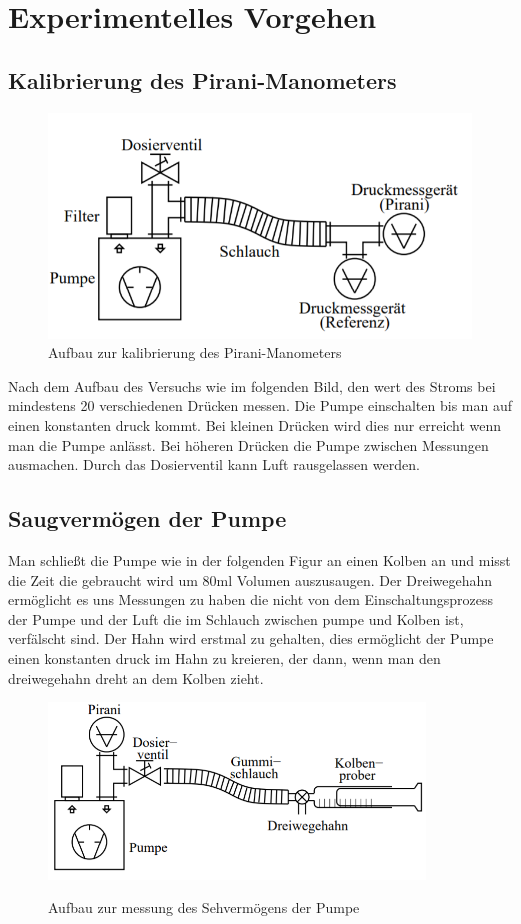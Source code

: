 \documentclass[12pt]{article}
\begin{document}
	  
	\section{Experimentelles Vorgehen}\label{sec:exp}
	\subsection{Kalibrierung des Pirani-Manometers}
 
		\begin{figure}[H]
		\centering
		\includegraphics[width=10 cm]{kalibrierung.png}
		\caption{Aufbau zur kalibrierung des Pirani-Manometers}
		\label{fig: kalibrierung}
		\end{figure}
		Nach dem Aufbau des Versuchs wie im folgenden Bild, den wert des Stroms bei mindestens 20 verschiedenen Drücken messen. Die Pumpe einschalten bis man auf einen konstanten druck kommt. Bei kleinen Drücken wird dies nur erreicht wenn man die Pumpe anlässt. Bei höheren Drücken die Pumpe zwischen Messungen ausmachen. Durch das Dosierventil kann Luft rausgelassen werden.
	\subsection{Saugvermögen der Pumpe}
	Man schließt die Pumpe wie in der folgenden Figur an einen Kolben an und misst die Zeit die gebraucht wird um 80ml Volumen auszusaugen. Der Dreiwegehahn ermöglicht es uns Messungen zu haben die nicht von dem Einschaltungsprozess der Pumpe und der Luft die im Schlauch zwischen pumpe und Kolben ist, verfälscht sind. Der Hahn wird erstmal zu gehalten, dies ermöglicht der Pumpe einen konstanten druck im Hahn zu kreieren, der dann, wenn man den dreiwegehahn dreht an dem Kolben zieht.
	\begin{figure}[H]
		\centering
		\includegraphics[width=10cm]{Saugvermoegen.png}
		\label{fig: Saugvermögen }
		\caption{Aufbau zur messung des Sehvermögens der Pumpe}
	\end{figure}
\end{document}
